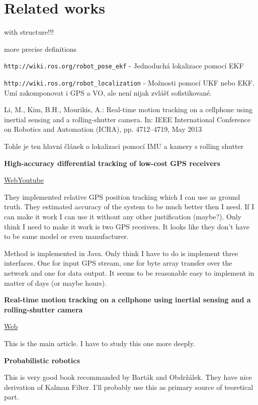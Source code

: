 \chapter{Related works}

with structure!!!

more precise definitions

\verb+http://wiki.ros.org/robot_pose_ekf+ - Jednoduchá lokalizace pomocí EKF

\verb+http://wiki.ros.org/robot_localization+ - Možnosti pomocí UKF nebo EKF. Umí zakomponovat i GPS a VO, ale není nijak zvlášť sofistikované.

Li, M., Kim, B.H., Mourikis, A.: Real-time motion tracking on a cellphone using
inertial sensing and a rolling-shutter camera. In: IEEE International Conference
on Robotics and Automation (ICRA), pp. 4712–4719, May 2013

Tohle je ten hlavní článek o lokalizaci pomocí IMU a kamery s rolling shutter

\textbf{High-accuracy differential tracking of low-cost GPS receivers} 

\cite{hedgecock2013high}
\href{http://www.isis.vanderbilt.edu/projects/relativeGPS}{Web}\href{https://www.youtube.com/watch?v=BH149tSPrhs}{Youtube}

They implemented relative GPS position tracking which I can use as ground truth. They estimated accuracy of the system to be much better then I need. If I can make it work I can use it without any other justification (maybe?). Only think I need to make it work is two GPS receivers. It looks like they don't have to be same model or even manufacturer.

Method is implemented in Java. Only think I have to do is implement three interfaces. One for input GPS stream, one for byte array transfer over the network and one for data output. It seems to be reasonable easy to implement in matter of days (or maybe hours). 

\textbf{Real-time motion tracking on a cellphone using inertial sensing and a rolling-shutter camera}

\cite{li2013real} 
\href{http://www.ee.ucr.edu/~mli/RollingShutterVIO.html}{Web}

This is the main article. I have to study this one more deeply.

\textbf{Probabilistic robotics}

\cite{thrun2005probabilistic}

This is very good book recommanded by Barták and Obdržálek. They have nice derivation of Kalman Filter. I'll probably use this as primary source of teoretical part.

